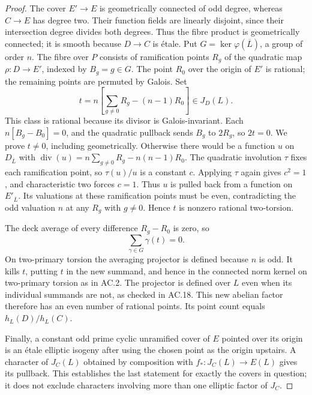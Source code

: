 \begin{proof}
The cover $E'\to E$ is geometrically connected of odd degree, whereas
$C\to E$ has degree two.  Their function fields are linearly disjoint,
since their intersection degree divides both degrees.  Thus the fibre
product is geometrically connected; it is smooth because $D\to C$
is \'etale.  Put $G=\ker\varphi(\overline L)$, a group of order $n$.
The fibre over $P$ consists of ramification points $R_g$ of the
quadratic map $\rho:D\to E'$, indexed by $B_g=g\in G$.
The point $R_0$ over the origin of $E'$ is rational; the remaining
points are permuted by Galois.  Set
\[
        t=n\left[\sum_{g\ne0}R_g-(n-1)R_0\right]\in J_D(L).
\]
This class is rational because its divisor is Galois-invariant.
Each $n[B_g-B_0]=0$, and the quadratic pullback sends $B_g$ to
$2R_g$, so $2t=0$.  We prove $t\ne0$, including geometrically.
Otherwise there would be a function $u$ on $D_{\overline L}$ with
$\operatorname{div}(u)=n\sum_{g\ne0}R_g-n(n-1)R_0$.
The quadratic involution $\tau$
fixes each ramification point, so $\tau(u)/u$ is a constant $c$.
Applying $\tau$ again gives $c^2=1$, and characteristic two forces
$c=1$.  Thus $u$ is pulled back from a function on $E'_{\overline L}$.
Its valuations at these ramification points must be even, contradicting
the odd valuation $n$ at any $R_g$ with $g\ne0$.
Hence $t$ is nonzero rational
two-torsion.

The deck average of every difference $R_g-R_0$ is zero, so
\[
                          \sum_{\gamma\in G}\gamma(t)=0.
\]
On two-primary torsion the averaging projector is defined because
$n$ is odd.  It kills $t$, putting $t$ in the new summand, and hence in
the connected norm kernel on two-primary torsion as in AC.2.
The projector is defined over $L$ even when its individual summands
are not, as checked in AC.18.
This new abelian factor therefore has an even number of rational
points.  Its point count equals $h_L(D)/h_L(C)$.

Finally, a constant odd prime cyclic unramified cover of $E$ pointed
over its origin is an \'etale elliptic isogeny after using the chosen
point as the origin upstairs.  A character of $J_C(L)$ obtained by
composition with $f_*:J_C(L)\to E(L)$ gives its pullback.  This
establishes the last statement for exactly the covers in question;
it does not exclude characters involving more than one elliptic
factor of $J_C$.
\end{proof}

